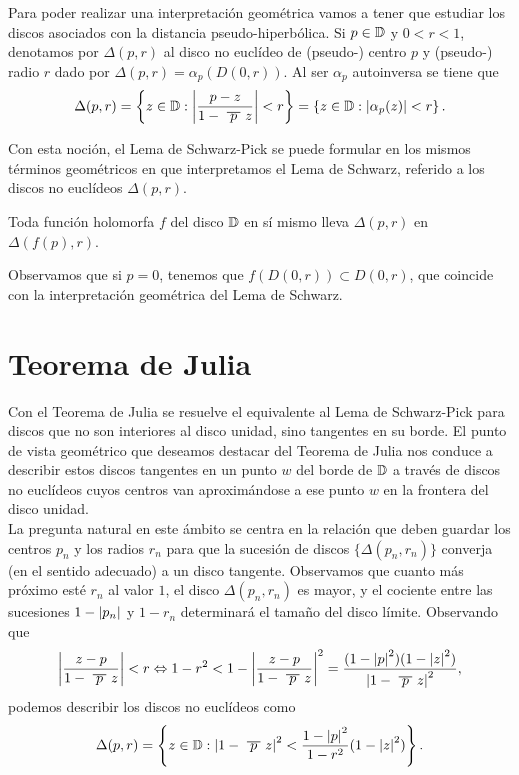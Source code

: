 Para poder realizar una interpretación geométrica vamos a tener que estudiar los discos asociados con la distancia pseudo-hiperbólica. Si $p \in \mathbb{D}$ y $0 < r < 1$, denotamos por $\Delta(p,r)$ al disco no euclídeo de (pseudo-) centro $p$ y (pseudo-) radio $r$ dado por $\Delta(p,r) = \alpha_p(D(0,r))$. Al ser $\alpha_p$ autoinversa se tiene que
\begin{equation*}
    \Delta(p,r) = \left\{z \in \disk: \abs{\frac{p-z}{1 - \xbar{p}z}} < r\right\} = \left\{z \in \disk: \abs{\alpha_p(z)} < r \right\}.
\end{equation*}

Con esta noción, el Lema de Schwarz-Pick se puede formular en los mismos términos geométricos en que interpretamos el Lema de Schwarz, referido a los discos no euclídeos $\Delta(p,r)$. \\

\begin{theorem}
    Toda función holomorfa $f$ del disco $\mathbb{D}$ en sí mismo lleva $\Delta(p,r)$ en $\Delta(f(p),r)$.
\end{theorem}

Observamos que si $p = 0$, tenemos que $f(D(0,r)) \subset D(0,r)$, que coincide con la interpretación geométrica del Lema de Schwarz. \\

\section{Teorema de Julia}

Con el Teorema de Julia se resuelve el equivalente al Lema de Schwarz-Pick para discos que no son interiores al disco unidad, sino tangentes en su borde. El punto de vista geométrico que deseamos destacar del Teorema de Julia nos conduce a describir estos discos tangentes en un punto $w$ del borde de $\mathbb{D}$ a través de discos no euclídeos cuyos centros van aproximándose a ese punto $w$ en la frontera del disco unidad. \\

La pregunta natural en este ámbito se centra en la relación que deben guardar los centros $p_n$ y los radios $r_n$ para que la sucesión de discos $\{\Delta(p_n, r_n)\}$ converja (en el sentido adecuado) a un disco tangente. Observamos que cuanto más próximo esté $r_n$ al valor $1$, el disco $\Delta(p_n, r_n)$ es mayor, y el cociente entre las sucesiones $1 - \left\lvert p_n\right\rvert$ y $1 - r_n$ determinará el tamaño del disco límite. Observando que
\begin{equation*}
    \abs{\frac{z-p}{1 - \xbar{p}z}} < r \Leftrightarrow 1 - r^2 < 1 -  \abs{\frac{z-p}{1 - \xbar{p}z}}^2 = \frac{(1-\abs{p}^2)(1-\abs{z}^2)}{\abs{1-\xbar{p}z}^2},
\end{equation*}
podemos describir los discos no euclídeos como
\begin{equation*}
\Delta(p,r) = \left\{z \in \disk : \abs{1-\xbar{p}z}^2 < \frac{1-\abs{p}^2}{1-r^2} (1-\abs{z}^2)\right\}.
\end{equation*}

